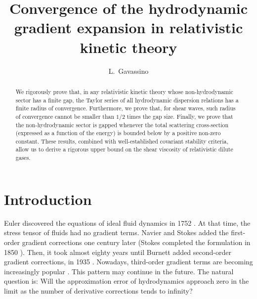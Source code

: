 \documentclass[a4paper, amsfonts, amssymb, amsmath, reprint, showkeys, nofootinbib, twoside, onecolumn,notitlepage]{revtex4-2}
\theoremstyle{definition}
\theoremstyle{theorem}
\theoremstyle{corollary}
\begin{document}
\title{Convergence of the hydrodynamic gradient expansion in relativistic kinetic theory}
\author{L.~Gavassino}


\begin{abstract}
We rigorously prove that, in any relativistic kinetic theory whose non-hydrodynamic sector has a finite gap, the Taylor series of all hydrodynamic dispersion relations has a finite radius of convergence. Furthermore, we prove that, for shear waves, such radius of convergence cannot be smaller than $1/2$ times the gap size. Finally, we prove that the non-hydrodynamic sector is gapped whenever the total scattering cross-section (expressed as a function of the energy) is bounded below by a positive non-zero constant. These results, combined with well-established covariant stability criteria, allow us to derive a rigorous upper bound on the shear viscosity of relativistic dilute gases.
\end{abstract} 



\maketitle


\vspace{-1cm}

\section{Introduction} 



Euler discovered the equations of ideal fluid dynamics in 1752 \cite{Christodoulou2007Compressible}. At that time, the stress tensor of fluids had no gradient terms. Navier and Stokes added the first-order gradient corrections one century later (Stokes completed the formulation in 1850 \cite{HistoryNavierStokes}). Then, it took almost eighty years until Burnett added second-order gradient corrections, in 1935 \cite{Burnett1935}. Nowadays, third-order gradient terms are becoming increasingly popular \cite{El:2009vj,Jaiswal:2013vta,GrozdanovThirdOrder2015kqa,deBrito:2023tgb}. This pattern may continue in the future. The natural question is: Will the approximation error of hydrodynamics approach zero in the limit as the number of derivative corrections tends to infinity?
\end{document}
